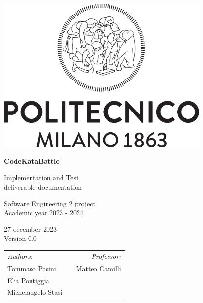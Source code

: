 
\begin{titlepage}
    \begin{center}
        \includegraphics[width=0.8\textwidth]{images/PoliMi_Logo.png}

        \vspace*{2cm}
        \textbf{\huge CodeKataBattle}

        \vspace{0.5cm}
        \LARGE Implementation and Test\\deliverable documentation

        \vspace{1.5cm}
        \normalsize Software Engineering 2 project\\
        Academic year 2023 - 2024

        \vspace{0.5cm}
        27 december 2023\\
        Version 0.0

        \vspace{1cm}
        \small
        \begin{table}[b]
            \centering
            \begin{tabular}{l p{5.5cm} l}
                \textit{Authors:}   &  & \multicolumn{1}{r}{\textit{Professor:}} \\
                Tommaso Pasini      &  & \multicolumn{1}{r}{Matteo Camilli}      \\
                Elia Pontiggia      &  & \textbf{}                               \\
                Michelangelo Stasi  &  & \textbf{}
            \end{tabular}
        \end{table}

    \end{center}
\end{titlepage}